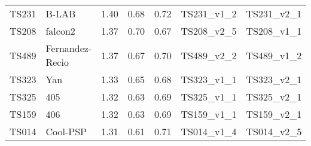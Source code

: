 \begin{table}[ht]
{\begin{tabular}{llrrrll}
TS231 & B-LAB & 1.40 & 0.68 & 0.72 & TS231\_v1\_2 & TS231\_v2\_1 \\ 
TS208 & falcon2 & 1.37 & 0.70 & 0.67 & TS208\_v2\_5 & TS208\_v1\_1 \\ 
TS489 & Fernandez-Recio & 1.37 & 0.67 & 0.70 & TS489\_v2\_2 & TS489\_v1\_2 \\ 
TS323 & Yan & 1.33 & 0.65 & 0.68 & TS323\_v1\_1 & TS323\_v2\_1 \\ 
TS325 & 405 & 1.32 & 0.63 & 0.69 & TS325\_v1\_1 & TS325\_v2\_1 \\ 
TS159 & 406 & 1.32 & 0.63 & 0.69 & TS159\_v1\_1 & TS159\_v2\_1 \\ 
TS014 & Cool-PSP & 1.31 & 0.61 & 0.71 & TS014\_v1\_4 & TS014\_v2\_5 \\ 
\bottomrule
\end{tabular}%
}
\end{table}
